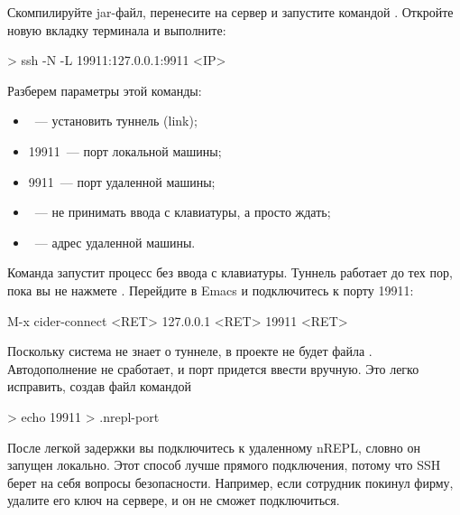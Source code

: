 Скомпилируйте jar-файл, перенесите на сервер и запустите командой . Откройте новую вкладку терминала и выполните:

\begin{english}
  \begin{bash}
> ssh -N -L 19911:127.0.0.1:9911 <IP>
  \end{bash}
\end{english}

Разберем параметры этой команды:

\begin{itemize}

\item
  ~--- установить туннель (link);

\item
  19911~--- порт локальной машины;

\item
  9911~--- порт удаленной машины;

\item
  ~--- не принимать ввода с клавиатуры, а просто ждать;

\item
  ~--- адрес удаленной машины.

\end{itemize}


Команда запустит процесс  без ввода с клавиатуры. Туннель работает до тех пор, пока вы не нажмете . Перейдите в Emacs и подключитесь к порту 19911:

\begin{english}
  \begin{clojure}
M-x cider-connect <RET> 127.0.0.1 <RET> 19911 <RET>
  \end{clojure}
\end{english}


Поскольку система не знает о туннеле, в проекте не будет файла . Автодополнение не сработает, и порт придется ввести вручную. Это легко исправить, создав файл командой

\begin{english}
  \begin{bash}
> echo 19911 > .nrepl-port
  \end{bash}
\end{english}

После легкой задержки вы подключитесь к удаленному nREPL, словно он запущен локально. Этот способ лучше прямого подключения, потому что SSH берет на себя вопросы безопасности. Например, если сотрудник покинул фирму, удалите его ключ на сервере, и он не сможет подключиться.

